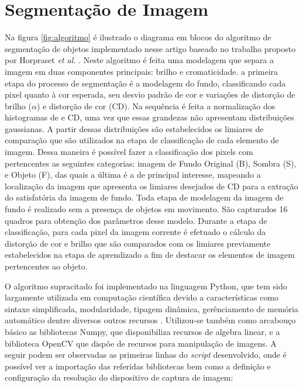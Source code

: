 \documentclass[conference]{IEEEtran}
\begin{document}
\section{Segmentação de Imagem}

Na figura \ref{fig:algoritmo} é ilustrado o diagrama em blocos do algoritmo de segmentação de objetos implementado nesse artigo baseado no trabalho  proposto por Horpraset \textit{et al.} \cite{IEEEhowto:horprasert}. Neste algoritmo é feita uma modelagem que   separa a imagem em duas componentes principais: brilho e cromaticidade. a primeira etapa do processo de segmentação é a modelagem do fundo, classificando cada pixel quanto à cor esperada, seu desvio padrão de cor e variações de distorção de brilho (\(\alpha\)) e distorção de cor (CD). Na sequência é feita a normalização dos histogramas de e CD, uma vez que essas grandezas não apresentam distribuições gaussianas. A partir dessas distribuições são estabelecidos os limiares de comparação que são utilizados na etapa de classificação de cada elemento de imagem. Dessa maneira  é possível fazer a classificação dos pixels com pertencentes as seguintes categorias: imagem de Fundo Original (B), Sombra (S), e Objeto  (F), das quais a última é a de principal interesse, mapeando a localização da imagem que apresenta os limiares desejados de CD para a extração do satisfatória da imagem de fundo. Toda etapa de modelagem da imagem de fundo é realizado sem a presença de objetos em movimento. São capturados 16 quadros para obtenção dos parâmetros desse modelo. Durante a etapa de classificação, para cada pixel da imagem corrente é efetuado o cálculo da distorção de cor e brilho que são comparados com os limiares previamente estabelecidos na etapa de aprendizado a fim de destacar os elementos de imagem pertencentes ao objeto.


O algoritmo supracitado foi implementado na linguagem Python, que tem sido largamente utilizada em computação científica devido a características como sintaxe simplificada, modularidade, tipagem dinâmica, gerênciamento de memória automático dentre diversos outros recursos \cite{IEEEhowto:fangohr}. Utilizou-se também como arcabouço básico as bibliotecas Numpy, que disponibiliza recursos de algebra linear, e a biblioteca OpenCV que dispõe de recursos para manipulação de imagens. A seguir podem ser observadas as primeiras linhas do \textit{script} desenvolvido, onde é possível ver a importação das referidas bibliotecas bem como a definição e configuração da resolução do dispositivo de captura de imagem:
\end{document}
